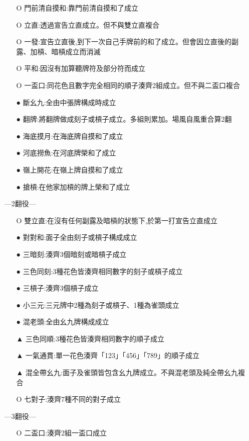 \documentclass[a4paper,12pt]{article}
\begin{document}
\begin{itemize}
\begin{itemize}
        \item[O] 門前清自摸和:靠門前清自摸和了成立
        \item[O] 立直:透過宣告立直成立。但不與雙立直複合
        \item[O] 一發:宣告立直後,到下一次自己手牌前的和了成立。但會因立直後的副露、加槓、暗槓成立而消滅
        \item[O] 平和:因沒有加算聽牌符及部分符而成立
        \item[O] 一盃口:同花色且數字完全相同的順子湊齊2組成立。但不與二盃口複合
        \item[●] 斷幺九:全由中張牌構成時成立
        \item[●] 翻牌:將翻牌做成刻子或槓子成立。多組則累加。場風自風重合算2翻
        \item[●] 海底摸月:在海底牌自摸和了成立
        \item[●] 河底撈魚:在河底牌榮和了成立
        \item[●] 嶺上開花:在嶺上牌自摸和了成立
        \item[●] 搶槓:在他家加槓的牌上榮和了成立
    \end{itemize}
    \item[] ---2翻役---
    \begin{itemize}
        \item[O] 雙立直:在沒有任何副露及暗槓的狀態下,於第一打宣告立直成立
        \item[●] 對對和:面子全由刻子或槓子構成成立
        \item[●] 三暗刻:湊齊3個暗刻或暗槓子成立
        \item[●] 三色同刻:3種花色皆湊齊相同數字的刻子或槓子成立
        \item[●] 三槓子:湊齊3個槓子成立
        \item[●] 小三元:三元牌中2種為刻子或槓子、1種為雀頭成立
        \item[●] 混老頭:全由幺九牌構成成立
        \item[▲] 三色同順:3種花色皆湊齊相同數字的順子成立
        \item[▲] 一氣通貫:單一花色湊齊「123」「456」「789」的順子成立
        \item[▲] 混全帶幺九:面子及雀頭皆包含幺九牌成立。不與混老頭及純全帶幺九複合
        \item[O] 七對子:湊齊7種不同的對子成立
    \end{itemize}
    \item[] ---3翻役---
    \begin{itemize}
        \item[O] 二盃口:湊齊2組一盃口成立

\end{itemize}
\end{itemize}
\end{document}
